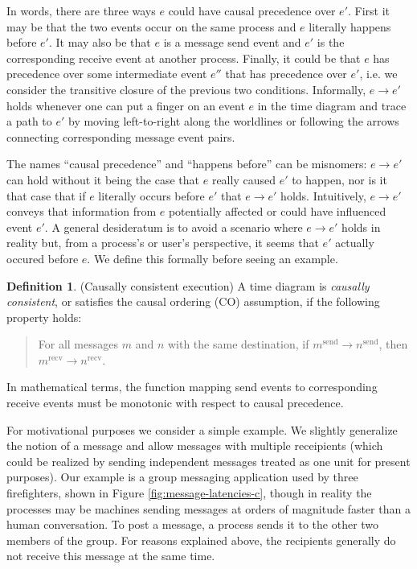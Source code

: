 \documentclass[]             %
{NASA}                       %
\theoremstyle{definition}
\newtheorem{definition}{Definition}[section]
\begin{document}
In words, there are three ways $e$ could have causal precedence over
$e'$.  First it may be that the two events occur on the same process
and $e$ literally happens before $e'$. It may also be that $e$ is a
message send event and $e'$ is the corresponding receive event at
another process. Finally, it could be that $e$ has precedence over
some intermediate event $e''$ that has precedence over $e'$, i.e. we
consider the transitive closure of the previous two
conditions. Informally, $e \to e'$ holds whenever one can put a finger
on an event $e$ in the time diagram and trace a path to $e'$ by moving
left-to-right along the worldlines or following the arrows connecting
corresponding message event pairs.

The names ``causal precedence'' and ``happens before'' can be misnomers: $e
\to e'$ can hold without it being the case that $e$ really caused $e'$
to happen, nor is it that case that if $e$ literally occurs before
$e'$ that $e \to e'$ holds. Intuitively, $e \to e'$ conveys that
information from $e$ potentially affected or could have influenced
event $e'$. A general desideratum is to avoid a scenario where $e \to
e'$ holds in reality but, from a process's or user's perspective, it
seems that $e'$ actually occured before $e$. We define this formally
before seeing an example.

\begin{definition}(Causally consistent execution)
  \label{def:causalorder}
  A time diagram is \emph{causally consistent}, or satisfies the
  causal ordering (CO) assumption, if the following property holds:
  \begin{quote}
  For all messages $m$ and $n$ with the same destination, if
  $m^\textrm{send} \to n^\textrm{send}$, then $m^\textrm{recv} \to
  n^\textrm{recv}$.
  \end{quote}
  In mathematical terms, the function mapping send events to
  corresponding receive events must be monotonic with respect to
  causal precedence.
\end{definition}

For motivational purposes we consider a simple example. We slightly
generalize the notion of a message and allow messages with multiple
receipients (which could be realized by sending independent messages
treated as one unit for present purposes). Our example is a group
messaging application used by three firefighters, shown in Figure
\ref{fig:message-latencies-c}, though in reality the processes may be
machines sending messages at orders of magnitude faster than a human
conversation. To post a message, a process sends it to the other two
members of the group. For reasons explained above, the recipients
generally do not receive this message at the same time.
\end{document}
